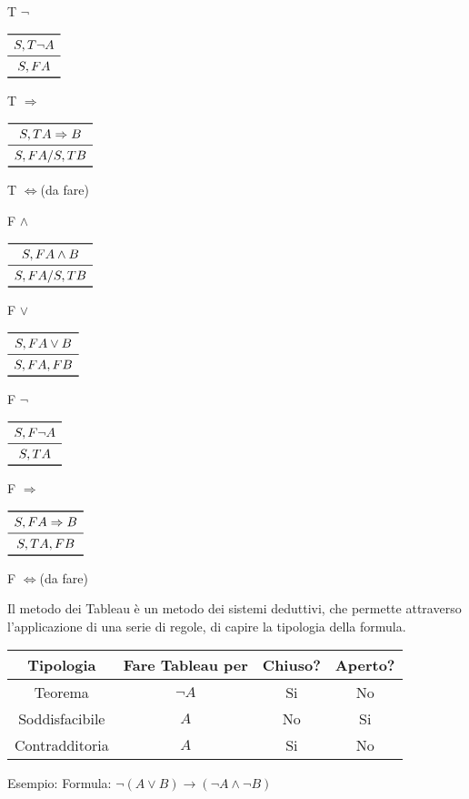 T $\neg$

$\begin{array}{c}
\toprule
S,T \neg A \\
\midrule
S, FA \\
\bottomrule
\end{array}$

T $\Rightarrow$

$\begin{array}{c}
\toprule
S,T A \Rightarrow B \\
\midrule
S, FA / S, TB \\
\bottomrule
\end{array}$

T $\iff$(da fare)

F $\land$

$\begin{array}{c}
\toprule
S,F A \land B \\
\midrule
S, FA/ S, TB \\
\bottomrule
\end{array}$

F $\lor$

$\begin{array}{c}
\toprule
S,F A \lor B \\
\midrule
S, FA, FB \\
\bottomrule
\end{array}$

F $\neg$

$\begin{array}{c}
\toprule
S,F \neg A \\
\midrule
S, TA \\
\bottomrule
\end{array}$

F $\Rightarrow$

$\begin{array}{c}
\toprule
S,F A \Rightarrow B \\
\midrule
S, TA, FB \\
\bottomrule
\end{array}$

F $\iff$(da fare)

Il metodo dei Tableau è un metodo dei sistemi deduttivi, che permette attraverso
l'applicazione di una serie di regole, di capire la tipologia della formula.

\begin{tabular}{cccc}
\toprule Tipologia & Fare Tableau per & Chiuso? & Aperto? \\
\midrule
         Teorema & $\neg A$ & Si & No \\
         Soddisfacibile & $A$ & No & Si \\
         Contradditoria & $A$ & Si & No \\
\bottomrule
\end{tabular}

Esempio: \newline
Formula: $ \neg(A \lor B) \rightarrow (\neg A \land \neg B)$

